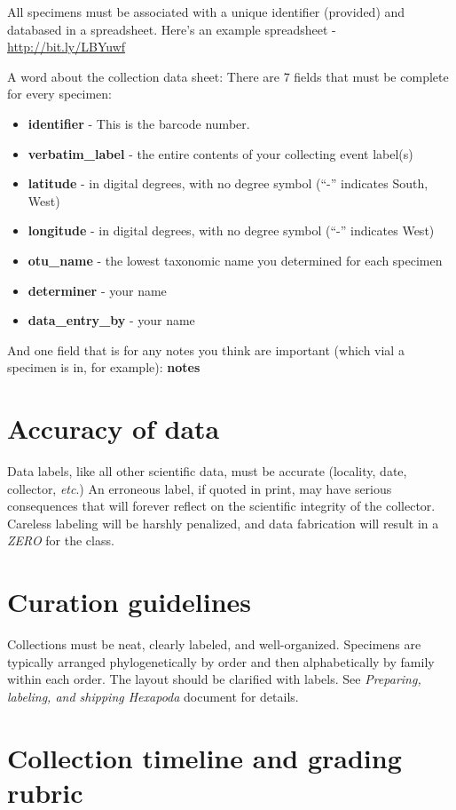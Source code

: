 \documentclass[letterpaper, 11pt]{article}
\begin{document}
All specimens must be associated with a unique identifier (provided) and databased in a spreadsheet. Here's an example spreadsheet - \url{http://bit.ly/LBYuwf}

A word about the collection data sheet: There are 7 fields that must be complete for every specimen:

\begin{itemize}
\item \textbf{identifier} - This is the barcode number.
\item \textbf{verbatim\_label} - the entire contents of your collecting event label(s) 
\item \textbf{latitude} - in digital degrees, with no degree symbol (``-'' indicates South, West)
\item \textbf{longitude} - in digital degrees, with no degree symbol (``-'' indicates West)
\item \textbf{otu\_name} - the lowest taxonomic name you determined for each specimen
\item \textbf{determiner} - your name
\item \textbf{data\_entry\_by} - your name
\end{itemize}

And one field that is for any notes you think are important (which vial a specimen is in, for example): \textbf{notes}

\section*{Accuracy of data}
Data labels, like all other scientific data, must be accurate (locality, date, collector, \textit{etc}.) An erroneous label, if quoted in print, may have serious consequences that will forever reflect on the scientific integrity of the collector. Careless labeling will be harshly penalized, and data fabrication will result in a \textit{ZERO} for the class. 

\section*{Curation guidelines}
Collections must be neat, clearly labeled, and well-organized. Specimens are typically arranged phylogenetically by order and then alphabetically by family within each order. The layout should be clarified with labels. See \textit{Preparing, labeling, and shipping Hexapoda} document for details.

\section*{Collection timeline and grading rubric}
\end{document}
